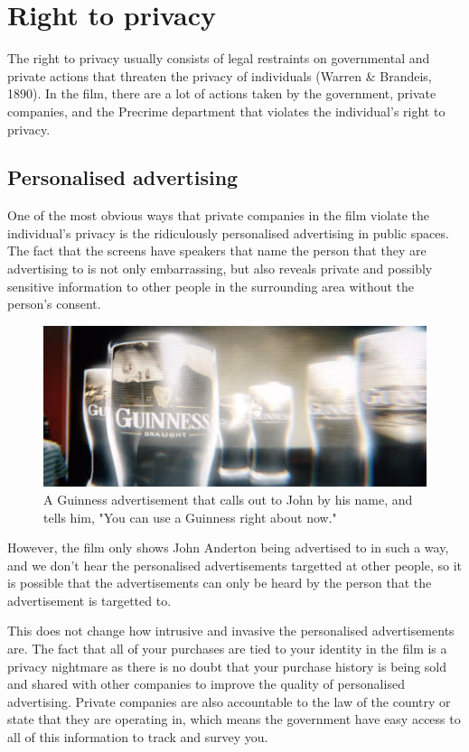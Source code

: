 \documentclass[11pt]{article}
\makeatletter
\newcommand{\citeprocitem}[2]{\hyper@linkstart{cite}{citeproc_bib_item_#1}#2\hyper@linkend}
\makeatother
\begin{document}
 \newpage

\section{Right to privacy}
\label{sec:orgdc321ff}
The right to privacy usually consists of legal restraints on governmental
and private actions that threaten the privacy of individuals
(\citeprocitem{12}{Warren \& Brandeis, 1890}).
In the film, there are a lot of actions taken by the government, private
companies, and the Precrime department that violates the
individual's right to privacy.

\subsection{Personalised advertising}
\label{sec:org027859e}
One of the most obvious ways that private companies in the film violate
the individual's privacy is the ridiculously personalised advertising
in public spaces. The fact that the screens have speakers that name the
person that they are advertising to is not only embarrassing, but also
reveals private and possibly sensitive information to other people
in the surrounding area without the person's consent.

\begin{figure}[htbp]
\centering
\includegraphics[width=.9\linewidth]{./images/guinness-personalised-advertising-to-john.png}
\caption{A Guinness advertisement that calls out to John by his name, and tells him, "You can use a Guinness right about now."}
\end{figure}

However, the film only shows John Anderton being advertised to in such
a way, and we don't hear the personalised advertisements targetted at
other people, so it is possible that the advertisements can only
be heard by the person that the advertisement
is targetted to.

 \newpage

This does not change how intrusive and invasive the personalised
advertisements are. The fact that all of your purchases are tied to your
identity in the film is a privacy nightmare as there is no doubt
that your purchase history is being sold and shared with other
companies to improve the quality of personalised advertising.
Private companies are also accountable to the law of the country
or state that they are operating in, which means the government
have easy access to all of this information to track and survey you.
\end{document}
